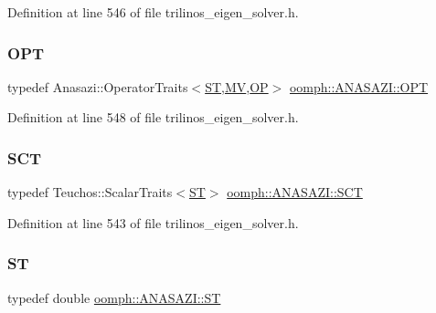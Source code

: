 Definition at line 546 of file trilinos\+\_\+eigen\+\_\+solver.\+h.

\mbox{\label{classoomph_1_1ANASAZI_ab1bca328746775f4d6adcb6709afe57f}} 
\subsubsection{\texorpdfstring{O\+PT}{OPT}}
{\footnotesize\ttfamily typedef Anasazi\+::\+Operator\+Traits$<$\hyperlink{classoomph_1_1ANASAZI_a604b8dc6a0618d81dfce82849d5b47a7}{ST},\hyperlink{classoomph_1_1ANASAZI_aa1922409eb193949b0cb4e89d43316ed}{MV},\hyperlink{classoomph_1_1ANASAZI_ac89159c0da5e64ce641a2bcb8bd2d2be}{OP}$>$ \hyperlink{classoomph_1_1ANASAZI_ab1bca328746775f4d6adcb6709afe57f}{oomph\+::\+A\+N\+A\+S\+A\+Z\+I\+::\+O\+PT}\hspace{0.3cm}{\ttfamily [private]}}



Definition at line 548 of file trilinos\+\_\+eigen\+\_\+solver.\+h.

\mbox{\label{classoomph_1_1ANASAZI_a1bb5eb9f072ed92f48fdd32ca22abd0e}} 
\subsubsection{\texorpdfstring{S\+CT}{SCT}}
{\footnotesize\ttfamily typedef Teuchos\+::\+Scalar\+Traits$<$\hyperlink{classoomph_1_1ANASAZI_a604b8dc6a0618d81dfce82849d5b47a7}{ST}$>$ \hyperlink{classoomph_1_1ANASAZI_a1bb5eb9f072ed92f48fdd32ca22abd0e}{oomph\+::\+A\+N\+A\+S\+A\+Z\+I\+::\+S\+CT}\hspace{0.3cm}{\ttfamily [private]}}



Definition at line 543 of file trilinos\+\_\+eigen\+\_\+solver.\+h.

\mbox{\label{classoomph_1_1ANASAZI_a604b8dc6a0618d81dfce82849d5b47a7}} 
\subsubsection{\texorpdfstring{ST}{ST}}
{\footnotesize\ttfamily typedef double \hyperlink{classoomph_1_1ANASAZI_a604b8dc6a0618d81dfce82849d5b47a7}{oomph\+::\+A\+N\+A\+S\+A\+Z\+I\+::\+ST}\hspace{0.3cm}{\ttfamily [private]}}



